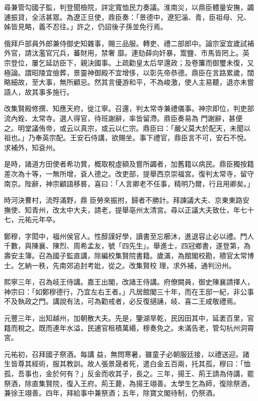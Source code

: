 \begin{pinyinscope}
 尋兼管勾國子監，判登聞檢院，詳定寬恤民力奏議。淮南災，以鼎臣體量安撫，蠲逋振貸，全活甚眾。為遼正旦使，鼎臣奏：「景德中，遼犯淄、青，臣祖母、兄、姊皆見略，義不忍往。」許之，仍詔後子孫並免行焉。



 俄拜戶部員外郎兼侍御史知雜事，賜三品服。轉吏、禮二部郎中。論宗室宜歲試補外官，請汰濫官冗兵，蕃財用，禁奢
 靡。連劾薛向奸暴，鬻鹽、市馬皆罔上。英宗登位，屢乞延訪臣下，親決國事。上疏勸皇太后早還政；及卷簾而御璽未復，又極論。謂昭陵宜儉葬，景靈神御殿不宜增侈，以彰先帝恭德。鼎臣在言路累歲，闊略細故，至大事，無所顧忌。然其言優游和平，不為峻激，使人主易聽，退亦未嘗語人，故其事多施行。



 改集賢殿修撰、知應天府，徙江寧。召還，判太常寺兼禮儀事。神宗即位，判吏部流內銓、太常寺。選人得官，待班謝辭，率皆留滯。鼎臣奏易為
 門謝辭，甚便之。明堂議侑帝，或云以真宗，或云以仁宗。鼎臣曰：「嚴父莫大於配天，未聞以祖也。」乃奉英宗配。王安石侍講，欲賜坐。事下禮官，鼎臣言不可，安石不悅。求補外，知袞州。



 是時，諸道方田使者希功賞，概取稅虛額及嘗所蠲者，加舊籍以病民。鼎臣獨按籍差次為十等，一無所增，袞人德之。改吏部，提舉西京崇福宮。復判太常寺，留守南京。陛辭，神宗顧語移晷，喜曰：「人言卿老不任事，精明乃爾，行且用卿矣。」



 時河決曹村，流殍滿野，鼎
 臣勞來振拊，歸者不勝計。拜諫議大夫、京東東路安撫使、知青州，改太中大夫，請老，提舉亳州太清宮。尋以正議大夫致仕，年七十七，元祐元年卒。



 鄭穆，字閎中，福州侯官人。性醇謹好學，讀書至忘櫛沐，進退容止必以禮。門人千數，與陳襄、陳烈、周希孟友，號「四先生」。舉進士，四冠鄉書，遂登第，為壽安主簿。召為國子監直講，除編校集賢院書籍。歲滿，為館閣校勘，積官太常博士。乞納一秩，先南郊追封考妣，從之。改集賢校
 理，求外補，通判汾州。



 熙寧三年，召為岐王侍講。嘉王出閣，改諸王侍講。府僚闕員，御史陳襄請擇人，神宗曰：「如鄭穆德行，乃宜左右王者。」凡居館閣三十年，而在王邸一紀，非公事不及執政之門。講說有法，可為勸戒者，必反復擿誦，岐、喜二王咸敬禮焉。



 元豐三年，出知越州，加朝散大夫。先是，鑒湖旱乾，民因田其中，延袤百里，官籍而稅之。既而連年水溢，民逋官租積萬緡，穆奏免之。未滿告老，管勾杭州洞霄宮。



 元祐初，召拜國子祭酒。每講
 益，無問寒暑，雖童子必朝服廷接，以禮送迎。諸生皆尊其經術，服其教訓。故人張景晟者死，遣白金五百兩，托其孤，穆曰：「恤孤，吾事也，金於何有？」反金而收其子，長之。三年，揚王、荊王請為侍講，罷祭酒，除直集賢院，復入王府。荊王薨，為揚王翊善。太學生乞為師，復除祭酒，兼徐王翊善。四年，拜給事中兼祭酒；五年，除寶文閣待制，仍祭酒。




\end{pinyinscope}

